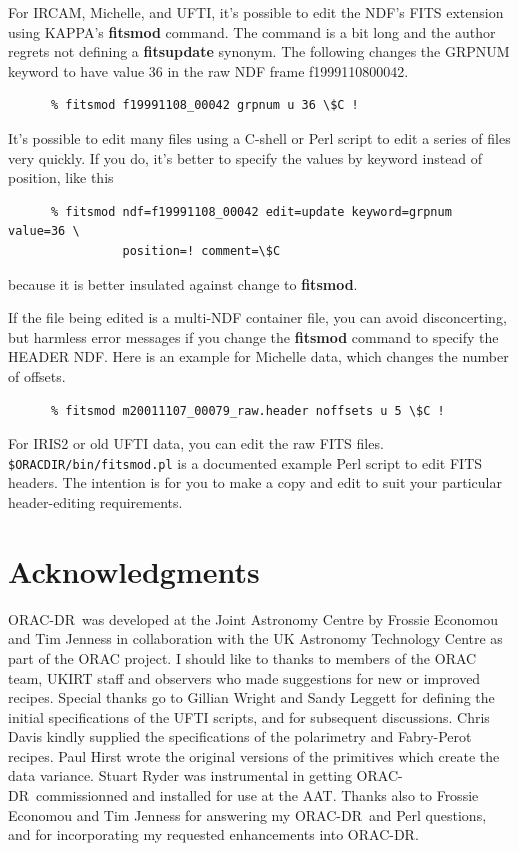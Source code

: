 \documentclass[twoside,11pt]{article}
\newcommand{\xref}[3]{#1}
\renewcommand{\_}{\texttt{\symbol{95}}}
\newcommand{\KAPPA}{{\footnotesize KAPPA}}
\newcommand{\ORACDR}{{\footnotesize ORAC-DR}}
\begin{document}
For IRCAM, Michelle, and UFTI, it's possible to edit the NDF's
\xref{FITS extension}{sun95}{se_fitsairlock} using \KAPPA's
\xref{{\bf fitsmod}}{sun95}{FITSMOD} command.  The command is a bit
long and the author regrets not defining a {\bf fitsupdate} synonym.
The following changes the GRPNUM keyword to have value 36 in the raw
NDF frame f19991108\_00042.

\begin{verbatim}
      % fitsmod f19991108_00042 grpnum u 36 \$C !
\end{verbatim}

It's possible to edit many files using a \xref{C-shell}{sc4}{} or Perl
script to edit a series of files very quickly.  If you do, it's better
to specify the values by keyword instead of position, like this

\begin{verbatim}
      % fitsmod ndf=f19991108_00042 edit=update keyword=grpnum value=36 \
                position=! comment=\$C
\end{verbatim}
because it is better insulated against change to {\bf fitsmod}.

If the file being edited is a multi-NDF container file, you can avoid
disconcerting, but harmless error messages if you change the {\bf
fitsmod} command to specify the HEADER NDF.  Here is an example for
Michelle data, which changes the number of offsets.

\begin{verbatim}
      % fitsmod m20011107_00079_raw.header noffsets u 5 \$C !
\end{verbatim}

For IRIS2 or old UFTI data, you can edit the raw FITS files.  {\tt
\$ORAC\_DIR/bin/fitsmod.pl} is a documented example Perl script to
edit FITS headers.  The intention is for you to make a copy and edit
to suit your particular header-editing requirements.

\section{Acknowledgments}

\ORACDR\ was developed at the Joint Astronomy Centre by Frossie
Economou and Tim Jenness in collaboration with the UK Astronomy
Technology Centre as part of the ORAC project.  I should like to
thanks to members of the ORAC team, UKIRT staff and observers who made
suggestions for new or improved recipes.  Special thanks go to Gillian
Wright and Sandy Leggett for defining the initial specifications of
the UFTI scripts, and for subsequent discussions.  Chris Davis kindly
supplied the specifications of the polarimetry and Fabry-Perot
recipes.  Paul Hirst wrote the original versions of the primitives
which create the data variance. Stuart Ryder was instrumental in
getting \ORACDR\ commissionned and installed for use at the AAT. Thanks also
to Frossie Economou and Tim Jenness for answering my \ORACDR\ and
Perl questions, and for incorporating my requested enhancements into
\ORACDR.
\end{document}
